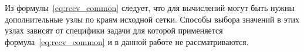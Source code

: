 Из формулы~\eqref{eq:recv_common} следует, что для вычислений
могут быть нужны дополнительные
узлы по краям исходной сетки.
Способы выбора значений в этих узлах зависят
от специфики задачи для которой применяется формула~\eqref{eq:recv_common}  
и в данной работе не рассматриваются.

\begin{comment}

  -->Перенесено в начало!
 
Будем полагать, что $K$ узлов в которых известны значения функции $\varphi$
расположены на отрезке $[0, K-1]$ с единичным шагом ($h=1$).
Сетку с известными значениями в узлах будем называть \textit{крупной сеткой}.
Требуется вычислить значения 
в $M$ узлах,
равномерно расположенных на исходном отрезке,
где $N$ --- произвольное натуральное число.
Сетку размером $M = N(K-1) + K$ будем называть
\textit{мелкой сеткой}.
Обозначим $N^* = N+1$.
В этих обозначениях количество узлов мелкой сетки $M = N^* (K-1) + 1$.


\end{comment}




